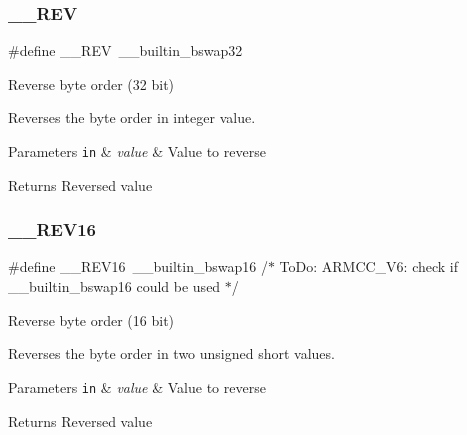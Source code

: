 \subsubsection{\texorpdfstring{\+\_\+\+\_\+\+R\+EV}{\_\_REV}\hspace{0.1cm}{\footnotesize\ttfamily [2/2]}}
{\footnotesize\ttfamily \#define \+\_\+\+\_\+\+R\+EV~\+\_\+\+\_\+builtin\+\_\+bswap32}



Reverse byte order (32 bit) 

Reverses the byte order in integer value. 
\begin{DoxyParams}[1]{Parameters}
\mbox{\tt in}  & {\em value} & Value to reverse \\
\hline
\end{DoxyParams}
\begin{DoxyReturn}{Returns}
Reversed value 
\end{DoxyReturn}
\mbox{\label{group___c_m_s_i_s___core___instruction_interface_ga4e3acd41e7667cdf65ffcd8c76a8613f}} 
\subsubsection{\texorpdfstring{\+\_\+\+\_\+\+R\+E\+V16}{\_\_REV16}}
{\footnotesize\ttfamily \#define \+\_\+\+\_\+\+R\+E\+V16~\+\_\+\+\_\+builtin\+\_\+bswap16                           /$\ast$ To\+Do\+:  A\+R\+M\+C\+C\+\_\+\+V6\+: check if \+\_\+\+\_\+builtin\+\_\+bswap16 could be used $\ast$/}



Reverse byte order (16 bit) 

Reverses the byte order in two unsigned short values. 
\begin{DoxyParams}[1]{Parameters}
\mbox{\tt in}  & {\em value} & Value to reverse \\
\hline
\end{DoxyParams}
\begin{DoxyReturn}{Returns}
Reversed value 
\end{DoxyReturn}
\mbox{\label{group___c_m_s_i_s___core___instruction_interface_ga95b9bd281ddeda378b85afdb8f2ced86}} 
